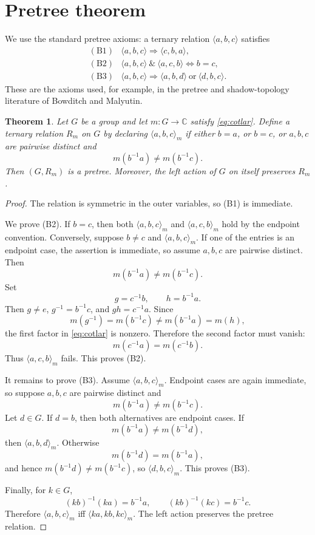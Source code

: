 \documentclass[11pt]{article}
\newtheorem{theorem}{Theorem}
\begin{document}
\section*{Pretree theorem}

We use the standard pretree axioms: a ternary relation
\(\langle a,b,c\rangle\) satisfies
\[
\begin{array}{ll}
\mathrm{(B1)} & \langle a,b,c\rangle\Rightarrow \langle c,b,a\rangle,\\
\mathrm{(B2)} & \langle a,b,c\rangle\ \&\ \langle a,c,b\rangle
                 \Longleftrightarrow b=c,\\
\mathrm{(B3)} & \langle a,b,c\rangle\Rightarrow
                 \langle a,b,d\rangle\ \text{or}\ \langle d,b,c\rangle.
\end{array}
\]
These are the axioms used, for example, in the pretree and shadow-topology
literature of Bowditch and Malyutin.

\begin{theorem}
\label{thm:pretree}
Let \(G\) be a group and let \(m:G\to\mathbb C\) satisfy \eqref{eq:cotlar}.
Define a ternary relation \(R_m\) on \(G\) by declaring
\(\langle a,b,c\rangle_m\) if either \(b=a\), or \(b=c\), or \(a,b,c\) are
pairwise distinct and
\[
  m(b^{-1}a)\ne m(b^{-1}c).
\]
Then \((G,R_m)\) is a pretree. Moreover, the left action of \(G\) on itself
preserves \(R_m\).
\end{theorem}

\begin{proof}
The relation is symmetric in the outer variables, so (B1) is immediate.

We prove (B2). If \(b=c\), then both \(\langle a,b,c\rangle_m\) and
\(\langle a,c,b\rangle_m\) hold by the endpoint convention. Conversely,
suppose \(b\ne c\) and \(\langle a,b,c\rangle_m\). If one of the entries is
an endpoint case, the assertion is immediate, so assume \(a,b,c\) are
pairwise distinct. Then
\[
  m(b^{-1}a)\ne m(b^{-1}c).
\]
Set
\[
  g=c^{-1}b,\qquad h=b^{-1}a.
\]
Then \(g\ne e\), \(g^{-1}=b^{-1}c\), and \(gh=c^{-1}a\). Since
\[
  m(g^{-1})=m(b^{-1}c)\ne m(b^{-1}a)=m(h),
\]
the first factor in \eqref{eq:cotlar} is nonzero. Therefore the second factor
must vanish:
\[
  m(c^{-1}a)=m(c^{-1}b).
\]
Thus \(\langle a,c,b\rangle_m\) fails. This proves (B2).

It remains to prove (B3). Assume \(\langle a,b,c\rangle_m\). Endpoint cases
are again immediate, so suppose \(a,b,c\) are pairwise distinct and
\[
  m(b^{-1}a)\ne m(b^{-1}c).
\]
Let \(d\in G\). If \(d=b\), then both alternatives are endpoint cases. If
\[
  m(b^{-1}a)\ne m(b^{-1}d),
\]
then \(\langle a,b,d\rangle_m\). Otherwise
\[
  m(b^{-1}d)=m(b^{-1}a),
\]
and hence \(m(b^{-1}d)\ne m(b^{-1}c)\), so
\(\langle d,b,c\rangle_m\). This proves (B3).

Finally, for \(k\in G\),
\[
  (kb)^{-1}(ka)=b^{-1}a,\qquad (kb)^{-1}(kc)=b^{-1}c.
\]
Therefore \(\langle a,b,c\rangle_m\) iff
\(\langle ka,kb,kc\rangle_m\). The left action preserves the pretree
relation.
\end{proof}
\end{document}
